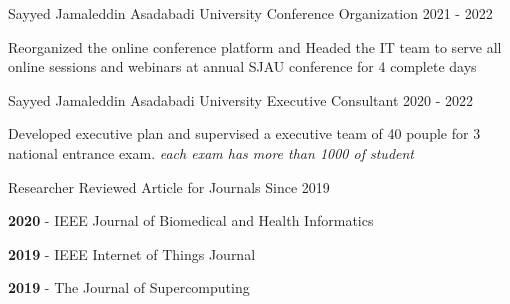 

\begin{cventries}

  \cventry
    {Sayyed Jamaleddin Asadabadi University}
    {Conference Organization} %
    {} %
    {2021 - 2022} %
    {
      \begin{cvitems} %
        \item {Reorganized the online conference platform and Headed the IT team to serve all online sessions and webinars at annual SJAU conference for 4 complete days}
      \end{cvitems}
    }
    
  \cventry
    {Sayyed Jamaleddin Asadabadi University}
    {Executive Consultant} %
    {} %
    {2020 - 2022} %
    {
      \begin{cvitems} %
        \item {Developed executive plan and supervised a executive team of 40 pouple for 3 national entrance exam. \textit{each exam has more than 1000 of student}}
      \end{cvitems}
    }
    
  \cventry
    {Researcher}
    {Reviewed Article for Journals} %
    {} %
    {Since 2019} %
    {
      \begin{cvitems} %
        \item {\textbf{2020} - IEEE Journal of Biomedical and Health Informatics}
        \item {\textbf{2019} - IEEE Internet of Things Journal}
        \item {\textbf{2019} - The Journal of Supercomputing}
      \end{cvitems}
    }
\end{cventries}
